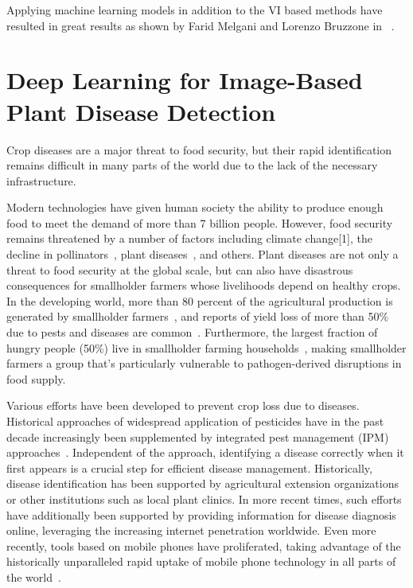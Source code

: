 Applying machine learning models in addition to the VI based methods have resulted in great results as shown by Farid Melgani and Lorenzo Bruzzone in ~\cite{melgani2004classification}.


\section{Deep Learning for Image-Based Plant Disease Detection}
Crop diseases are a major threat to food security, but their rapid identification remains difficult in many parts of the world due to the lack of the necessary infrastructure.

Modern technologies have given human society the ability to produce enough food to meet the demand of more than 7 billion people. However, food security remains threatened by a number of factors including climate change[1], the decline in pollinators~\cite{bay2008speeded}, plant diseases~\cite{dalal2005histograms}, and others. Plant diseases are not only a threat to food security at the global scale, but can also have disastrous consequences for smallholder farmers whose livelihoods depend on healthy crops. In the developing world, more than 80 percent of the agricultural production is generated by smallholder farmers~\cite{deng2009imagenet}, and reports of yield loss of more than 50\% due to pests and diseases are common~\cite{ehler2006integrated}. Furthermore, the largest fraction of hungry people (50\%) live in smallholder farming households~\cite{everingham2010pascal}, making smallholder farmers a group that’s particularly vulnerable to pathogen-derived disruptions in food supply.

Various efforts have been developed to prevent crop loss due to diseases. Historical approaches of widespread application of pesticides have in the past decade increasingly been supplemented by integrated pest management (IPM) approaches~\cite{garcia2013comparison}. Independent of the approach, identifying a disease correctly when it first appears is a crucial step for efficient disease management. Historically, disease identification has been supported by agricultural extension organizations or other institutions such as local plant clinics. In more recent times, such efforts have additionally been supported by providing information for disease diagnosis online, leveraging the increasing internet penetration worldwide. Even more recently, tools based on mobile phones have proliferated, taking advantage of the historically unparalleled rapid uptake of mobile phone technology in all parts of the world~\cite{bold2012mobile}. 


